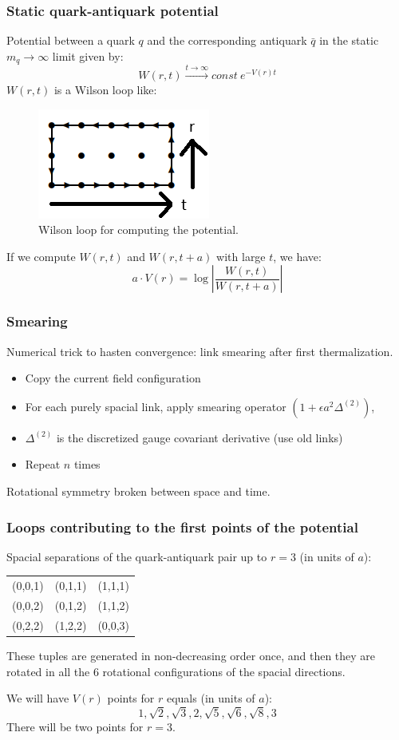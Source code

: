 \documentclass{beamer}
\begin{document}
\begin{frame}
    \frametitle{Static quark-antiquark potential}
    Potential between a quark $q$ and the corresponding antiquark $\bar{q}$ in the static $m_q \rightarrow \infty$ limit given by:
    \begin{equation*}
        W(r,t) \xrightarrow{t \rightarrow \infty} const\ e^{-V(r) t}
    \end{equation*}
    $W(r, t)$ is a Wilson loop like:
    \begin{figure}
        \centering
        \includegraphics[width=0.3\linewidth]{quark.png}
        \caption{Wilson loop for computing the potential.}
        \label{fig:enter-label}
    \end{figure}
    If we compute $W(r,t)$ and $W(r, t+a)$ with large $t$, we have:
    \begin{equation*}
        a \cdot V(r) = \log\left|\frac{W(r,t)}{W(r,t+a)}\right|
    \end{equation*}
\end{frame}

\begin{frame}
    \frametitle{Smearing}
    Numerical trick to hasten convergence: link smearing after first thermalization.
    \begin{itemize}
        \item Copy the current field configuration
        \item For each purely spacial link, apply smearing operator $(1+\epsilon a^2 \Delta^{(2)})$,
        \item $\Delta^{(2)}$ is the discretized gauge covariant derivative (use old links)
        \item Repeat $n$ times
    \end{itemize}
    Rotational symmetry broken between space and time.
\end{frame}

\begin{frame}
    \frametitle{Loops contributing to the first points of the potential}
    Spacial separations of the quark-antiquark pair up to $r=3$ (in units of $a$):
    \begin{center}
    \begin{tabular}{c c c }
     (0,0,1) & (0,1,1) & (1,1,1) \\
     (0,0,2) & (0,1,2) & (1,1,2) \\
     (0,2,2) & (1,2,2) & (0,0,3) \\
    \end{tabular}
    \end{center}
    These tuples are generated in non-decreasing order once, and then they are rotated in all the $6$ rotational configurations of the spacial directions.

    We will have $V(r)$ points for $r$ equals (in units of $a$):
    $$1, \sqrt{2}, \sqrt{3}, 2, \sqrt{5}, \sqrt{6}, \sqrt{8}, 3$$
    There will be two points for $r=3$.
\end{frame}
\end{document}
